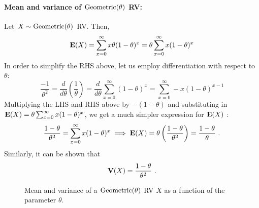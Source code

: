 \paragraph{Mean and variance of $\mbox{{\rm Geometric}}(\theta)$ RV:}
Let $X \sim \mbox{{\rm Geometric}}(\theta)$ RV.  Then,
\[
\mathbf{E}(X) = \sum_{x=0}^{\infty} x \theta(1-\theta)^x =  \theta \sum_{x=0}^{\infty} x (1-\theta)^x
\]
In order to simplify the RHS above, let us employ differentiation with respect to $\theta$:
\[
\frac{-1}{\theta^2}= \frac{d}{d\theta} \left( \frac{1}{\theta} \right)= \frac{d}{d\theta} \sum_{x=0}^{\infty} (1-\theta)^x  =  \sum_{x=0}^{\infty} -x (1-\theta)^{x-1}
\]
Multiplying the LHS and RHS above by $-(1-\theta)$ and substituting in $\mathbf{E}(X)=  \theta \sum_{x=0}^{\infty} x (1-\theta)^x$, we get a much simpler expression for $\mathbf{E}(X)$ :
\[
\frac{1-\theta}{\theta^2}= \sum_{x=0}^{\infty} x (1-\theta)^{x} \implies \mathbf{E}(X) = \theta \left( \frac{1-\theta}{\theta^2} \right) = \frac{1-\theta}{\theta} \ .
\]
Similarly, it can be shown that
\[
\mathbf{V}(X) = \frac{1-\theta}{\theta^2} \ .
\]

\begin{figure}[htpb]
\caption{Mean and variance of a $\mbox{{\rm Geometric}}(\theta)$ RV $X$ as a function of the parameter $\theta$.\label{F:MeanVarGeom}}
\centering   {}
\end{figure}

